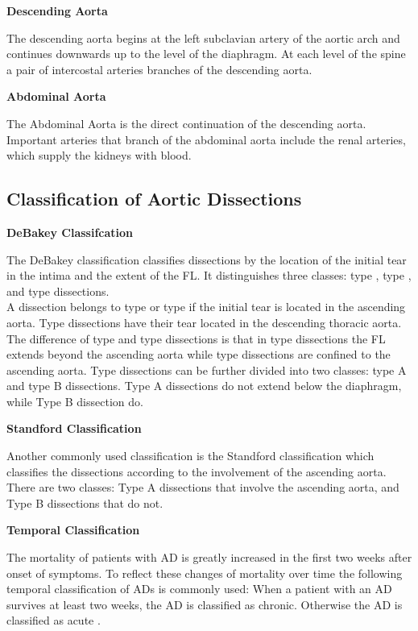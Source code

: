 \documentclass[thesis.tex]{subfiles}
\begin{document}
\textbf{Descending Aorta}

The descending aorta begins at the  left subclavian artery of the aortic arch and continues downwards up to the level of the diaphragm. At each level of the spine a pair of intercostal arteries branches of the descending aorta.

\textbf{Abdominal Aorta}

The Abdominal Aorta is the direct continuation of the descending aorta. Important arteries that branch of the abdominal aorta include the renal arteries, which supply the kidneys with blood.  

\subsection{Classification of Aortic Dissections}
\textbf{DeBakey Classifcation}

The DeBakey classification \cite{desanctis1987aortic,goldfinger2014thoracic,criado2011aortic} classifies dissections by the location of the initial tear in the intima and the extent of the FL. It distinguishes three classes: type , type , and type  dissections. \\ A dissection belongs to type  or type  if the initial tear is located in the ascending aorta. Type  dissections have their tear located in the descending thoracic aorta. The difference of type  and type  dissections is that in type  dissections the FL extends beyond the ascending aorta while type  dissections are confined to the ascending aorta. Type  dissections can be further divided into two classes: type  A and type  B dissections. Type  A dissections do not extend below the diaphragm, while Type  B dissection do.

\textbf{Standford Classification}

Another commonly used classification is the Standford classification \cite{desanctis1987aortic,goldfinger2014thoracic,criado2011aortic} which classifies the dissections according to the involvement of the ascending aorta. There are two classes: Type A dissections that involve the ascending aorta, and Type B dissections that do not. 

\textbf{Temporal Classification}

The mortality of patients with AD is greatly increased in the first two weeks after onset of symptoms. To reflect these changes of mortality over time the following temporal classification of ADs is commonly used: When a patient with an AD survives at least two weeks, the AD is classified as chronic. Otherwise the AD is classified as acute \cite{olsson2007thoracic,desanctis1987aortic,criado2011aortic}.
\end{document}

